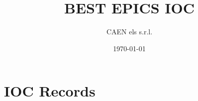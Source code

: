 \documentclass[12pt]{scrartcl}
\title{BEST EPICS IOC}
\author{CAEN els s.r.l.}
\date{\today}
\begin{document}
\maketitle

\clearpage

\tableofcontents

\clearpage
\section{IOC Records}

\end{document}
